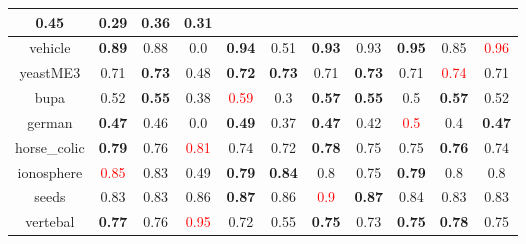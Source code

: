 \documentclass{article}%
\begin{document}
\begin{tabular}{c|cccccccccc}
{0.45
}&0.29&\textbf{0.36}&0.31\\%
\hline%
vehicle&\textbf{0.89}&0.88&0.0&\textbf{0.94}&0.51&\textbf{0.93}&0.93&\textbf{0.95}&0.85&\textcolor{red}{ 
0.96
}\\%
\hline%
yeastME3&0.71&\textbf{0.73}&0.48&\textbf{0.72}&\textbf{0.73}&0.71&\textbf{0.73}&0.71&\textcolor{red}{ 
0.74
}&0.71\\%
\hline%
bupa&0.52&\textbf{0.55}&0.38&\textcolor{red}{ 
0.59
}&0.3&\textbf{0.57}&\textbf{0.55}&0.5&\textbf{0.57}&0.52\\%
\hline%
german&\textbf{0.47}&0.46&0.0&\textbf{0.49}&0.37&\textbf{0.47}&0.42&\textcolor{red}{ 
0.5
}&0.4&\textbf{0.47}\\%
\hline%
horse\_colic&\textbf{0.79}&0.76&\textcolor{red}{ 
0.81
}&0.74&0.72&\textbf{0.78}&0.75&0.75&\textbf{0.76}&0.74\\%
\hline%
ionosphere&\textcolor{red}{ 
0.85
}&0.83&0.49&\textbf{0.79}&\textbf{0.84}&0.8&0.75&\textbf{0.79}&0.8&0.8\\%
\hline%
seeds&0.83&0.83&0.86&\textbf{0.87}&0.86&\textcolor{red}{ 
0.9
}&\textbf{0.87}&0.84&0.83&0.83\\%
\hline%
vertebal&\textbf{0.77}&0.76&\textcolor{red}{ 
0.95
}&0.72&0.55&\textbf{0.75}&0.73&\textbf{0.75}&\textbf{0.78}&0.75\\%
\hline%
\end{tabular}

%
\end{document}
